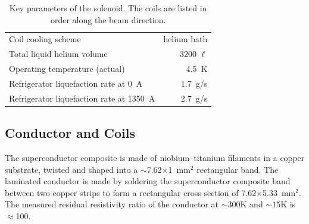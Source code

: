 \begin{table}[thp]
\begin{center}
\begin{tabular}{lr}
       Coil cooling scheme             & helium bath \\   
       Total liquid helium volume      & 3200 $\ell$ \\
       Operating temperature (actual)  &  4.5~K \\   
       Refrigerator liquefaction rate at 0~A        & 1.7~g/s    \\
       Refrigerator liquefaction rate at 1350~A     & 2.7~g/s    \\
     \hline
   \end{tabular}
   \normalsize
 \end{center}
  \caption{
    Key parameters of the \gx{} solenoid. The
    coils are listed in order along the beam direction.
    \label{tab:sol:summary}
  }
\end{table}


\subsection[Conductor and Coils]{Conductor and Coils
 \label{sec:sol:coils}
}

The superconductor composite is made of niobium--titanium filaments
in a copper substrate, twisted and shaped into a
$\sim$7.62$\times$1~mm$^2$ rectangular band. The laminated conductor
is made by soldering the superconductor composite band between two
copper strips
to form a rectangular cross section of 7.62$\times$5.33~mm$^2$.
The measured residual resistivity ratio of the conductor at $\sim{}300$K and
$\sim{}15$K is $\approx{}$100.  

